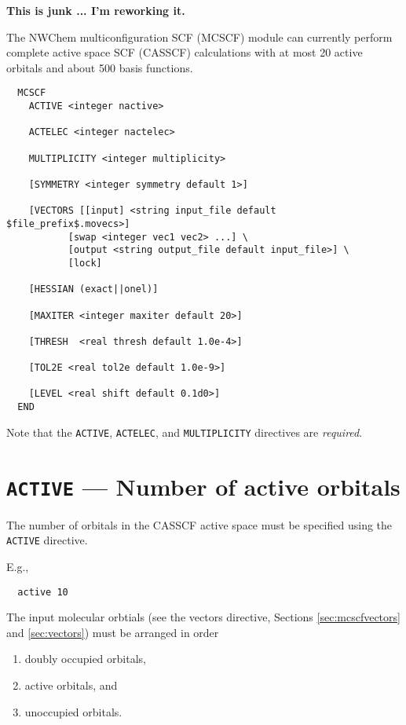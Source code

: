 \label{sec:mcscf}

{\bf This is junk ... I'm reworking it.}

The NWChem multiconfiguration SCF (MCSCF) module can currently perform
complete active space SCF (CASSCF) calculations with at most 20 active
orbitals and about 500 basis functions.

\begin{verbatim}
  MCSCF
    ACTIVE <integer nactive>

    ACTELEC <integer nactelec>

    MULTIPLICITY <integer multiplicity>

    [SYMMETRY <integer symmetry default 1>]

    [VECTORS [[input] <string input_file default $file_prefix$.movecs>] 
           [swap <integer vec1 vec2> ...] \
           [output <string output_file default input_file>] \
           [lock]

    [HESSIAN (exact||onel)]

    [MAXITER <integer maxiter default 20>]

    [THRESH  <real thresh default 1.0e-4>]

    [TOL2E <real tol2e default 1.0e-9>]

    [LEVEL <real shift default 0.1d0>]
  END
\end{verbatim}
Note that the \verb+ACTIVE+, \verb+ACTELEC+, and \verb+MULTIPLICITY+
directives are {\em required}.

\section{{\tt ACTIVE} --- Number of active orbitals}

The number of orbitals in the CASSCF active space must be specified
using the {\tt ACTIVE} directive.

E.g.,
\begin{verbatim}
  active 10
\end{verbatim}

The input molecular orbtials (see the vectors directive, Sections
\ref{sec:mcscfvectors} and \ref{sec:vectors}) must be arranged in
order
\begin{enumerate}
\item doubly occupied orbitals,
\item active orbitals, and
\item unoccupied orbitals.
\end{enumerate}

